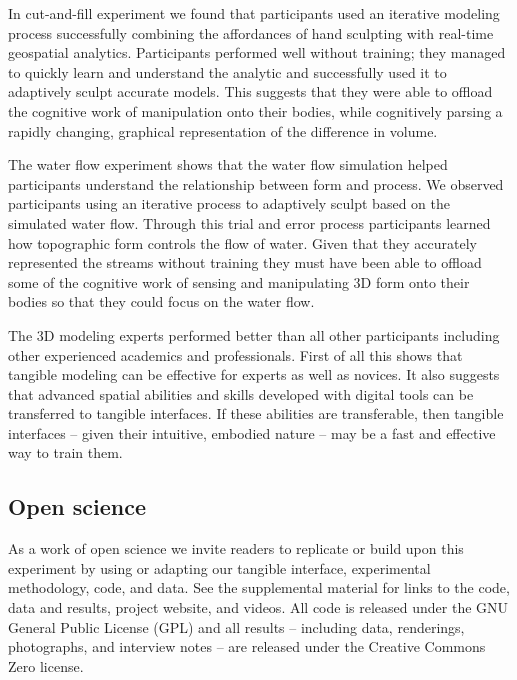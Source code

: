 \documentclass[Afour,sagev,times]{sagej} %
\begin{document}
In cut-and-fill experiment we found that
participants used an iterative modeling process
successfully combining the affordances of hand sculpting
with real-time geospatial analytics. 
Participants performed well without training; 
they managed to quickly learn and 
understand the analytic
and successfully used it to adaptively sculpt
accurate models.
This suggests that they were able to offload the cognitive work 
of manipulation onto their bodies, while cognitively 
parsing a rapidly changing, graphical representation 
of the difference in volume.

The water flow experiment shows 
that the water flow simulation helped participants 
understand the relationship between form and process.
We observed participants using an iterative process
to adaptively sculpt based on the simulated water flow. 
Through this trial and error process 
participants learned how
topographic form controls the flow of water.
Given that they accurately represented the streams without training
they must have been able to offload 
some of the cognitive work of sensing and manipulating 
3D form onto their bodies so that 
they could focus on the water flow. 

The 3D modeling experts 
performed better than all other participants
including other experienced academics and professionals. 
First of all this shows that 
tangible modeling
can be effective for experts as well as novices. 
It also suggests that advanced spatial abilities and skills
developed with digital tools can be transferred
to tangible interfaces. 
If these abilities are transferable, 
then tangible interfaces 
-- given their intuitive, embodied nature --
may be a fast and effective way to train them.

\subsection{Open science} 
As a work of open science we invite readers to
replicate or build upon this experiment by 
using or adapting our tangible interface, 
experimental methodology, code, and data. 
%
See the supplemental material 
for links to the
code,
data and results, 
project website,
and videos.
%
All code is released under the GNU General Public License (GPL)
and all results  
-- including data, renderings, photographs, and interview notes --
are released under the Creative Commons Zero license.
\end{document}
